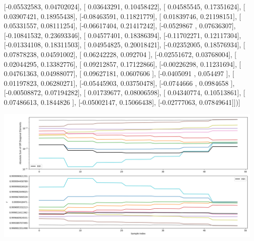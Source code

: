 \documentclass{article}
\begin{document}
       [-0.05532583,  0.04702024],
       [ 0.03643291,  0.10458422],
       [ 0.04585545,  0.17351624],
       [ 0.03907421,  0.18955438],
       [-0.08463591,  0.11821779],
       [ 0.01839746,  0.21198151],
       [ 0.05331557,  0.08111254],
       [-0.06617404,  0.21417242],
       [-0.0529867 ,  0.07636307],
       [-0.10841532,  0.23693346],
       [ 0.04577401,  0.18386394],
       [-0.11702271,  0.12117304],
       [-0.01334108,  0.18311503],
       [ 0.04954825,  0.20018421],
       [-0.02352005,  0.18576934],
       [ 0.07878238,  0.04591002],
       [ 0.06242228,  0.092704  ],
       [-0.02551672,  0.03768004],
       [ 0.02044295,  0.13382776],
       [ 0.09212857,  0.17122866],
       [-0.00226298,  0.11231694],
       [ 0.04761363,  0.04988077],
       [ 0.09627181,  0.0607606 ],
       [-0.0405091 ,  0.054497  ],
       [ 0.01197823,  0.06280271],
       [-0.05445903,  0.03750478],
       [-0.0744666 ,  0.0984658 ],
       [-0.00508872,  0.07194282],
       [ 0.01739677,  0.08006598],
       [ 0.04340774,  0.10513861],
       [ 0.07486613,  0.1844826 ],
       [-0.05002147,  0.15066438],
       [-0.02777063,  0.07849641]])]
\begin{center}
\includegraphics[scale=.9]{report_pickled_controls128/control_dpn_all.png}

\end{center}
\end{document}
